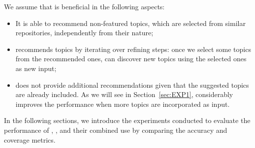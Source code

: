 

We assume that \TFb is beneficial in the following aspects:
\begin{itemize}
	\item It is able to recommend non-featured topics, which are selected from similar repositories, independently from their nature;
	\item \TFb recommends topics by iterating over refining steps: once we select some topics from the recommended ones, \TFb can discover new topics using the selected ones as new input;
	\item \MNB does not provide additional recommendations given that the suggested topics are already included. As we will see in Section~\ref{sec:EXP1}, \TFb considerably improves the performance when more topics are incorporated as input.
\end{itemize}

In the following sections, we introduce the experiments conducted to evaluate 
the performance of \TFa, \MNB, and their combined use by comparing the 
accuracy and coverage metrics.


